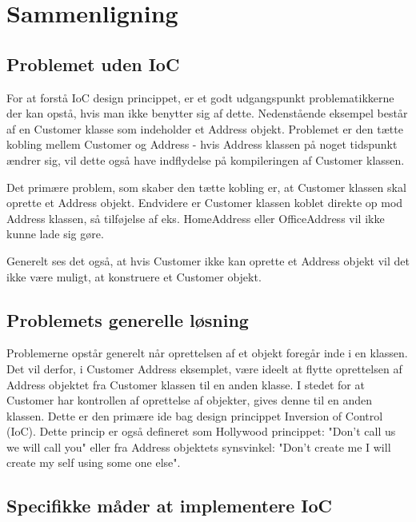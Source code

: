 \thispagestyle{fancy}
\chapter{Sammenligning}
\label{chp:comparison}

\section{Problemet uden IoC}

For at forstå IoC design princippet, er et godt udgangspunkt problematikkerne der kan opstå, hvis man ikke benytter sig af dette. Nedenstående eksempel består af en Customer klasse som indeholder et Address objekt. Problemet er den tætte kobling mellem Customer og Address - hvis Address klassen på noget tidspunkt ændrer sig, vil dette også have indflydelse på kompileringen af Customer klassen.


Det primære problem, som skaber den tætte kobling er, at Customer klassen skal oprette et Address objekt.
Endvidere er Customer klassen koblet direkte op mod Address klassen, så tilføjelse af eks. HomeAddress eller OfficeAddress vil ikke kunne lade sig gøre.

Generelt ses det også, at hvis Customer ikke kan oprette et Address objekt vil det ikke være muligt, at konstruere et Customer objekt.


\section{Problemets generelle løsning}

Problemerne opstår generelt når oprettelsen af et objekt foregår inde i en klassen. Det vil derfor, i Customer Address eksemplet, være ideelt at flytte oprettelsen af Address objektet fra Customer klassen til en anden klasse. I stedet for at Customer har kontrollen af oprettelse af objekter, gives denne til en anden klassen. Dette er den primære ide bag design princippet Inversion of Control (IoC).
Dette princip er også defineret som Hollywood princippet: "Don't call us we will call you" eller fra Address objektets synsvinkel: "Don't create me I will create my self using some one else".


\section{Specifikke måder at implementere IoC}

